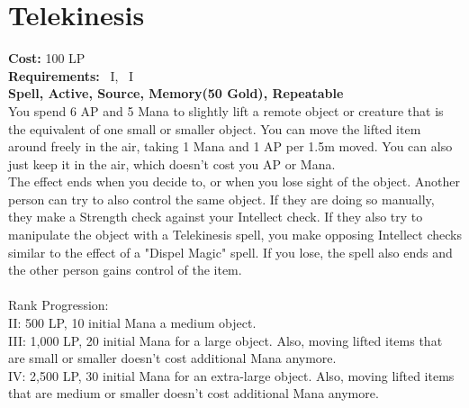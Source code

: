 \section{Telekinesis}\label{spell:telekinesis}
\textbf{Cost:} 100 LP\\
\textbf{Requirements:}~ I,~ I\\
\textbf{Spell, Active, Source, Memory(50 Gold), Repeatable}\\
You spend 6 AP and 5 Mana to slightly lift a remote object or creature that is the equivalent of one small or smaller object.
You can move the lifted item around freely in the air, taking 1 Mana and 1 AP per 1.5m moved.
You can also just keep it in the air, which doesn't cost you AP or Mana.\\
The effect ends when you decide to, or when you lose sight of the object.
Another person can try to also control the same object.
If they are doing so manually, they make a Strength check against your Intellect check.
If they also try to manipulate the object with a Telekinesis spell, you make opposing Intellect checks similar to the effect of a "Dispel Magic" spell.
If you lose, the spell also ends and the other person gains control of the item.\\
\\
Rank Progression:\\
II: 500 LP, 10 initial Mana a medium object.\\

III: 1,000 LP, 20 initial Mana for a large object.
Also, moving lifted items that are small or smaller doesn't cost additional Mana anymore.\\

IV: 2,500 LP, 30 initial Mana for an extra-large object.
Also, moving lifted items that are medium or smaller doesn't cost additional Mana anymore.